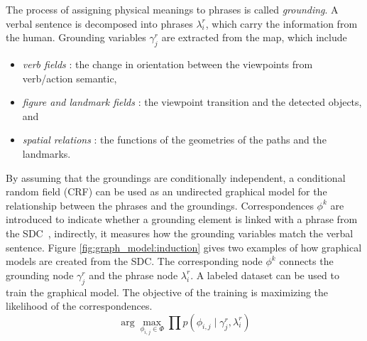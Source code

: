 \documentclass[phd]{byuprop}
\begin{document}
The process of assigning physical meanings to phrases is called {\em grounding}.
A verbal sentence is decomposed into phrases $ \lambda^{r}_{i} $, which carry the information from the human.
Grounding variables $ \gamma^{r}_{j} $ are extracted from the map, which include
\begin{itemize}
	\item {\em verb fields} : the change in orientation between the viewpoints from verb/action semantic,
	\item {\em figure and landmark fields} : the viewpoint transition and the detected objects, and
	\item {\em spatial relations} : the functions of the geometries of the paths and the landmarks.
\end{itemize}
By assuming that the groundings are conditionally independent, a conditional random field (CRF) can be used as an undirected graphical model for the relationship between the phrases and the groundings.
Correspondences $ \phi^{k} $ are introduced to indicate whether a grounding element is linked with a phrase from the SDC~\cite{tellex2011understanding},
indirectly, it measures how the grounding variables match the verbal sentence.
Figure \ref{fig:graph_model:induction} gives two examples of how graphical models are created from the SDC.
The corresponding node $ \phi^{k} $ connects the grounding node $ \gamma^{r}_{j} $ and the phrase node $ \lambda^{r}_{i} $.
A labeled dataset can be used to train the graphical model.
The objective of the training is maximizing the likelihood of the correspondences.
\begin{equation}
\label{eq:factor_graph_model}
\arg \max_{\phi_{i,j} \in \Phi } \prod p( \phi_{i,j} \mid \gamma^{r}_{j} , \lambda^{r}_{i} )
\end{equation}
\end{document}
